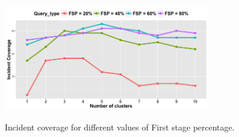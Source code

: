 \documentclass{acm_proc_article-sp}
\begin{document}
\begin{figure}[!h]
\centering
\includegraphics[width=9cm ,height=5.5cm]{figuresPng/Coverage_Result.png}
\caption{Incident coverage for different values of First stage percentage. }
\label{fig: clustCoverage}
\end{figure}
\end{document}
